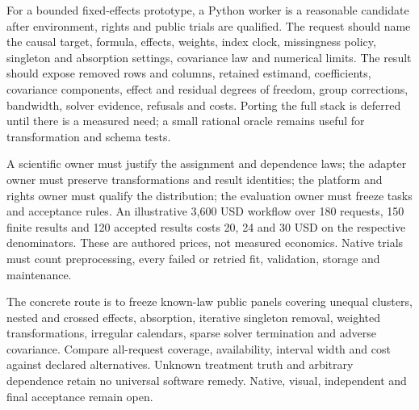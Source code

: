 For a bounded fixed-effects prototype, a Python worker is a reasonable
candidate after environment, rights and public trials are qualified.
The request should name the causal target, formula, effects, weights,
index clock, missingness policy, singleton and absorption settings,
covariance law and numerical limits. The result should expose removed rows
and columns, retained estimand, coefficients, covariance components,
effect and residual degrees of freedom, group corrections, bandwidth,
solver evidence, refusals and costs. Porting the full stack is deferred
until there is a measured need; a small rational oracle remains useful
for transformation and schema tests.\citep{exec24_lmpanel_reference}

A scientific owner must justify the assignment and dependence laws; the
adapter owner must preserve transformations and result identities; the
platform and rights owner must qualify the distribution; the evaluation
owner must freeze tasks and acceptance rules. An illustrative 3,600 USD
workflow over 180 requests, 150 finite results and 120 accepted results
costs 20, 24 and 30 USD on the respective denominators. These are authored
prices, not measured economics. Native trials must count preprocessing,
every failed or retried fit, validation, storage and maintenance.
\citep{exec24_lmpanel_reference}

The concrete route is to freeze known-law public panels covering unequal
clusters, nested and crossed effects, absorption, iterative singleton
removal, weighted transformations, irregular calendars, sparse solver
termination and adverse covariance. Compare all-request coverage,
availability, interval width and cost against declared alternatives.
Unknown treatment truth and arbitrary dependence retain no universal
software remedy. Native, visual, independent and final acceptance remain open.
\citep{exec24_lmpanel_reference}
